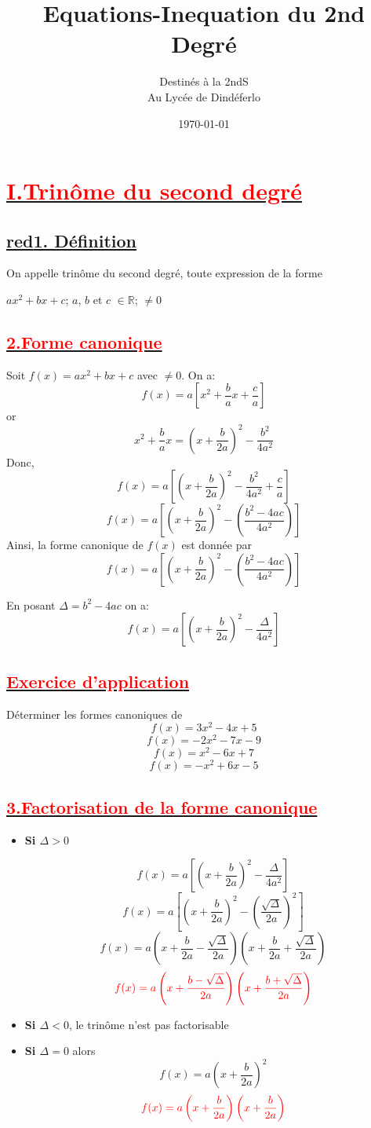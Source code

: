 \documentclass[12pt]{article}
\author{Destinés à la 2ndS\\Au Lycée de Dindéferlo}
\title{\textbf{Equations-Inequation du 2nd Degré}}
\date{\today}
\begin{document}
\maketitle
\newpage
\section*{\underline{\textbf{\textcolor{red}{I.Trinôme du second degré}}}}
\subsection*{\underline{\textbf{red}{1. Définition}}}
On appelle trinôme du second degré, toute expression de la forme

$ ax^{2}+bx+c $; $a$, $b$ et $c$ $\in \mathbb{R}$; $\neq 0 $
\subsection*{\underline{\textbf{\textcolor{red}{2.Forme canonique}}}}
Soit $f(x)= ax^{2}+bx+c $ avec $\neq 0$. On a:
\[f(x)=a\left[ x^{2}+\frac{b}{a}x+\frac{c}{a}\right] \] or 
\[x^{2}+\frac{b}{a}x=\left( x+\frac{b}{2a}\right) ^{2}-\frac{b^{2}}{4a^{2}}\]
Donc, \[f(x)=a\left[\left( x+\frac{b}{2a}\right) ^{2}-\frac{b^{2}}{4a^{2}}+\frac{c}{a}\right] \] 
\[f(x)=a\left[\left( x+\frac{b}{2a}\right) ^{2}-\left( \frac{b^{2}-4ac}{4a^{2}}\right) \right] \]
Ainsi, la forme canonique de $f(x)$ est donnée par \[f(x)=a\left[\left( x+\frac{b}{2a}\right) ^{2}-\left( \frac{b^{2}-4ac}{4a^{2}}\right) \right] \]

En posant $\Delta = b^{2}-4ac $ on a:
\[ f(x)=a \left[ \left(x+\frac{b}{2a}\right)^{2}-\frac{\Delta}{4a^{2}} \right] \]
\subsection*{\underline{\textbf{\textcolor{red}{Exercice d'application}}}}
Déterminer les formes canoniques de 
\[f(x)=3x^{2}-4x+5\]
\[f(x)=-2x^{2}-7x-9\]
\[f(x)=x^{2}-6x+7\]
\[f(x)=-x^{2}+6x-5\]
\subsection*{\underline{\textbf{\textcolor{red}{3.Factorisation de la forme canonique}}}}
\begin{itemize}
\item \textbf{Si $\Delta > 0 $}

\[f(x)=a\left[\left( x+\frac{b}{2a}\right)^{2}-\frac{\Delta}{4a^{2}}\right] \]
\[f(x)=a\left[\left( x+\frac{b}{2a}\right)^{2}-\left( \frac{\sqrt{\Delta}}{2a}\right)^{2} \right]\]
\[f(x)=a\left( x+\frac{b}{2a}-\frac{\sqrt{\Delta}}{2a}\right)\left( x+\frac{b}{2a}+\frac{\sqrt{\Delta}}{2a}\right)\]
\[
\textcolor{red}{
f(x)=a\left(x+\frac{b-\sqrt{\Delta}}{2a} \right)\left(x+\frac{b+\sqrt{\Delta}}{2a} \right)
}
\]

\item \textbf{Si $\Delta < 0 $}, le trinôme n'est pas factorisable

\item \textbf{Si $\Delta = 0 $} alors \[f(x)=a\left( x+\frac{b}{2a}\right)^{2}\] 
\[\textcolor{red}{
f(x)=a\left( x+\frac{b}{2a}\right) \left( x+\frac{b}{2a}\right)
}
\]
\end{itemize}
\end{document}
